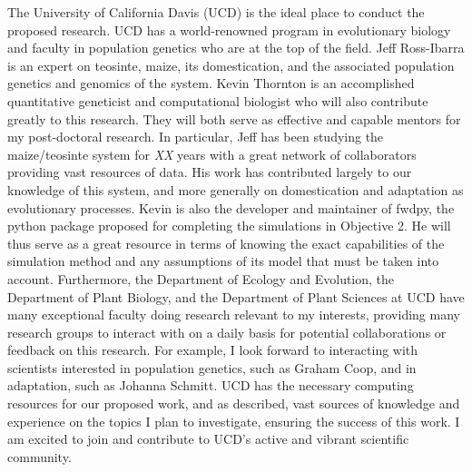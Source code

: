 The University of California Davis (UCD) is the ideal place to conduct the proposed research. UCD has a world-renowned program in evolutionary biology and faculty in population genetics who are at the top of the field. Jeff Ross\--Ibarra is an expert on teosinte, maize, its domestication, and the associated population genetics and genomics of the system.  
Kevin Thornton is an accomplished quantitative geneticist and computational biologist who will also contribute greatly to this research. 
They will both serve as effective and capable mentors for my post-doctoral research. In particular, Jeff has been studying the maize\//teosinte system for \emph{XX} years with a great network of collaborators providing vast resources of data. His work has contributed largely to our knowledge of this system, and more generally on domestication and adaptation as evolutionary processes. Kevin is also the developer and maintainer of fwdpy, the python package proposed for completing the simulations in Objective 2. He will thus serve as a great resource in terms of knowing the exact capabilities of the simulation method and any assumptions of its model that must be taken into account.
Furthermore, the Department of Ecology and Evolution, the Department of Plant Biology, and the Department of Plant Sciences at UCD have many exceptional faculty doing research relevant to my interests, providing many research groups to interact with on a daily basis for potential collaborations or feedback on this research. For example, I look forward to interacting with scientists interested in population genetics, such as Graham Coop, and in adaptation, such as Johanna Schmitt. %
UCD has the necessary computing resources for our proposed work, and as described, vast sources of knowledge and experience on the topics I plan to investigate, ensuring the success of this work. I am excited to join and contribute to UCD's active and vibrant scientific community.


